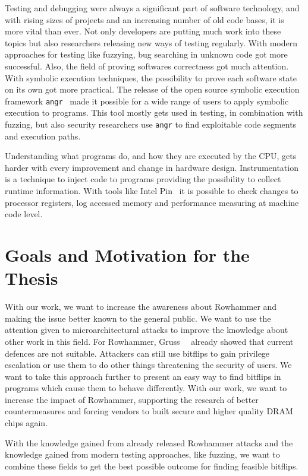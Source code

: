 Testing and debugging were always a significant part of software technology, and
with rising sizes of projects and an increasing number of old code bases, it is
more vital than ever. Not only developers are putting much work into these
topics but also researchers releasing new ways of testing regularly. With modern
approaches for testing like fuzzying, bug searching in unknown code got more
successful. Also, the field of proving software\textquotesingle s correctness
got much attention. With symbolic execution techniques, the possibility to prove
each software state on its own got more practical. The release of the open
source symbolic execution framework \texttt{angr}~\cite{angrpaper} made it
possible for a wide range of users to apply symbolic execution to programs. This
tool mostly gets used in testing, in combination with fuzzing, but also security
researchers use \texttt{angr} to find exploitable code segments and execution
paths.

Understanding what programs do, and how they are executed by the CPU, gets
harder with every improvement and change in hardware design. Instrumentation is
a technique to inject code to programs providing the possibility to collect
runtime information. With tools like Intel Pin~\cite{pintool} it is possible to
check changes to processor registers, log accessed memory and performance
measuring at machine code level.

\section{Goals and Motivation for the Thesis}

With our work, we want to increase the awareness about Rowhammer and making the
issue better known to the general public. We want to use the attention given to
microarchitectural attacks to improve the knowledge about other work in this
field. For Rowhammer, Gruss~\etal~\cite{flipinthewall} already showed that
current defences are not suitable. Attackers can still use bitflips to gain
privilege escalation or use them to do other things threatening the security of
users. We want to take this approach further to present an easy way to find
bitflips in programs which cause them to behave differently. With our work, we
want to increase the impact of Rowhammer, supporting the research of better
countermeasures and forcing vendors to built secure and higher quality DRAM
chips again.

With the knowledge gained from already released Rowhammer attacks and the
knowledge gained from modern testing approaches, like fuzzing, we want to
combine these fields to get the best possible outcome for finding feasible
bitflips.

